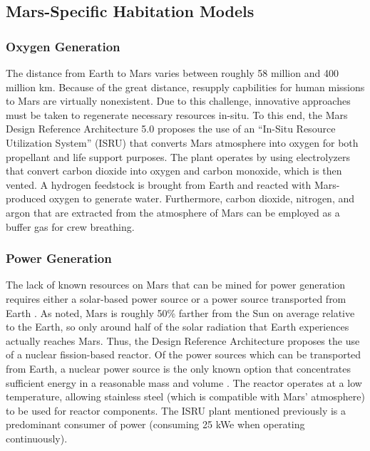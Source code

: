 \documentclass[12pt]{article}
\begin{document}
\subsection{Mars-Specific Habitation Models}

\subsubsection{Oxygen Generation}

The distance from Earth to Mars varies between roughly 58 million and 400
million km. Because of the great distance, resupply capbilities for human
missions to Mars are virtually nonexistent. Due to this challenge, innovative
approaches must be taken to regenerate necessary resources in-situ. To this end,
the Mars Design Reference Architecture 5.0 \cite{drake2010human} proposes
the use of an ``In-Situ Resource Utilization System'' (ISRU) that converts Mars
atmosphere into oxygen for both propellant and life support purposes. The plant
operates by using electrolyzers that convert carbon dioxide into oxygen and
carbon monoxide, which is then vented. A hydrogen feedstock is brought from
Earth and reacted with Mars-produced oxygen to generate water. Furthermore,
carbon dioxide, nitrogen, and argon that are extracted from the atmosphere of
Mars can be employed as a buffer gas for crew breathing.

\subsubsection{Power Generation}

The lack of known resources on Mars that can be mined for power generation
requires either a solar-based power source or a power source transported from
Earth \cite{hoffman1997human}. As noted, Mars is roughly 50\% farther from the
Sun on average relative to the Earth, so only around half of the solar
radiation that Earth experiences actually reaches Mars. Thus, the Design
Reference Architecture \cite{drake2010human} proposes the use of a nuclear
fission-based reactor. Of the power sources which can be transported from
Earth, a nuclear power source is the only known option that concentrates
sufficient energy in a reasonable mass and volume \cite{hoffman1997human}.
The reactor operates at a low temperature, allowing stainless steel (which is
compatible with Mars' atmosphere) to be used for reactor components. The ISRU
plant mentioned previously is a predominant consumer of power (consuming 25 kWe
when operating continuously).
\end{document}
